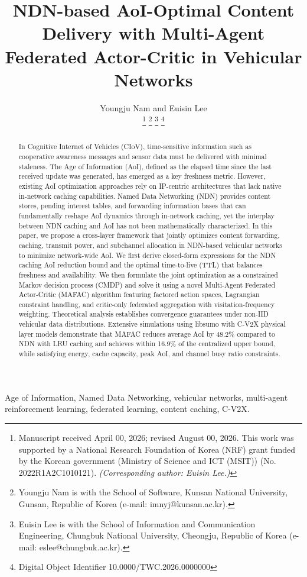 \documentclass[journal]{IEEEtran}
\title{NDN-based AoI-Optimal Content Delivery with Multi-Agent Federated Actor-Critic in Vehicular Networks}
\author{Youngju Nam and Euisin Lee

\thanks{Manuscript received April 00, 2026; revised August 00, 2026.
This work was supported by a National Research Foundation of Korea (NRF) grant funded by the Korean government (Ministry of Science and ICT (MSIT)) (No. 2022R1A2C1010121). \textit{(Corresponding author: Euisin Lee.)}}
\thanks{Youngju Nam is with the School of Software, Kunsan National University, Gunsan, Republic of Korea (e-mail: imnyj@kunsan.ac.kr).}
\thanks{Euisin Lee is with the School of Information and Communication Engineering, Chungbuk National University, Cheongju, Republic of Korea (e-mail: eslee@chungbuk.ac.kr).}
\thanks{Digital Object Identifier 10.0000/TWC.2026.0000000}}
\begin{document}
\maketitle

\begin{abstract}
In Cognitive Internet of Vehicles (CIoV), time-sensitive information such as cooperative awareness messages and sensor data must be delivered with minimal staleness. The Age of Information (AoI), defined as the elapsed time since the last received update was generated, has emerged as a key freshness metric. However, existing AoI optimization approaches rely on IP-centric architectures that lack native in-network caching capabilities. Named Data Networking (NDN) provides content stores, pending interest tables, and forwarding information bases that can fundamentally reshape AoI dynamics through in-network caching, yet the interplay between NDN caching and AoI has not been mathematically characterized. In this paper, we propose a cross-layer framework that jointly optimizes content forwarding, caching, transmit power, and subchannel allocation in NDN-based vehicular networks to minimize network-wide AoI. We first derive closed-form expressions for the NDN caching AoI reduction bound and the optimal time-to-live (TTL) that balances freshness and availability. We then formulate the joint optimization as a constrained Markov decision process (CMDP) and solve it using a novel Multi-Agent Federated Actor-Critic (MAFAC) algorithm featuring factored action spaces, Lagrangian constraint handling, and critic-only federated aggregation with visitation-frequency weighting. Theoretical analysis establishes convergence guarantees under non-IID vehicular data distributions. Extensive simulations using libsumo with C-V2X physical layer models demonstrate that MAFAC reduces average AoI by 48.2\% compared to NDN with LRU caching and achieves within 16.9\% of the centralized upper bound, while satisfying energy, cache capacity, peak AoI, and channel busy ratio constraints.
\end{abstract}

\begin{IEEEkeywords}
Age of Information, Named Data Networking, vehicular networks, multi-agent reinforcement learning, federated learning, content caching, C-V2X.
\end{IEEEkeywords}

\end{document}
